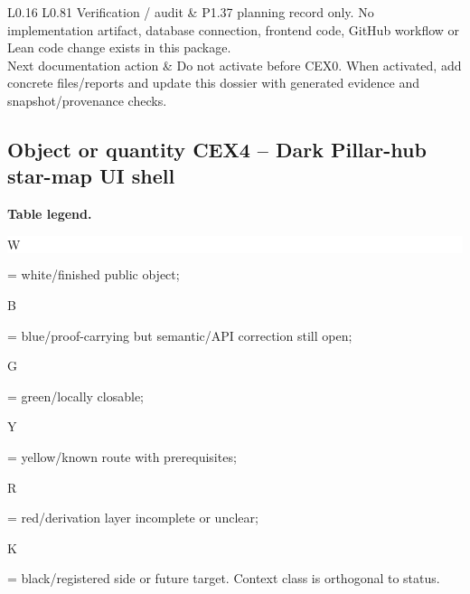 \begin{longtable}{L{0.16\linewidth} L{0.81\linewidth}}
\hline\addlinespace[0.20em]
Verification /\allowbreak{} audit & P1.37 planning record only. No implementation artifact, database connection, frontend code, GitHub workflow or Lean code change exists in this package.\\
\hline\addlinespace[0.20em]
Next documentation action & Do not activate before CEX0. When activated, add concrete files/\allowbreak{}reports and update this dossier with generated evidence and snapshot/\allowbreak{}provenance checks.\\
\hline\addlinespace[0.20em]
\end{longtable}
\subsection*{Object or quantity CEX4 -- Dark Pillar-hub star-map UI shell}
\hypertarget{objproof:CEX4}{}
\par\smallskip\noindent\begin{minipage}{0.99\linewidth}\footnotesize\raggedright\textbf{Table legend.} \colorbox{white}{\strut W} = white/finished public object; \colorbox{cyan!20}{\strut B} = blue/proof-carrying but semantic/API correction still open; \colorbox{green!18}{\strut G} = green/locally closable; \colorbox{yellow!25}{\strut Y} = yellow/known route with prerequisites; \colorbox{red!20}{\strut R} = red/derivation layer incomplete or unclear; \colorbox{black!18}{\strut K} = black/registered side or future target. Context class is orthogonal to status.\end{minipage}\par\vspace{0.25em}
